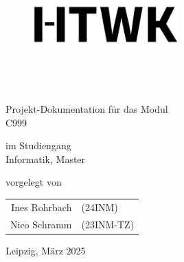 
\makeatletter
\begin{titlepage}

    \begin{figure}
        \centering
        \includegraphics[width=0.5\textwidth]{../assets/htwk_logo.png}
    \end{figure}

    \centering \large
    \vspace*{-1cm}

    \university \\
    \faculty

    \vfill
 
    {\Huge \textbf{\@title \\}}

    \vspace*{1cm}
    Projekt-Dokumentation für das Modul \\
    C999 \module

    \vfill

    im Studiengang\\
    Informatik, Master

    \vspace*{1cm}
    vorgelegt von

    \begin{tabular}{rl}
        Ines Rohrbach &{\normalsize (24INM)}\\
        Nico Schramm  &{\normalsize (23INM-TZ)}
    \end{tabular}

    \vspace*{0.5cm}
    \ccbysa

    \vspace*{0.5cm}
    \prof

    \vspace*{1cm}
    Leipzig, März 2025

\end{titlepage}
\makeatother
